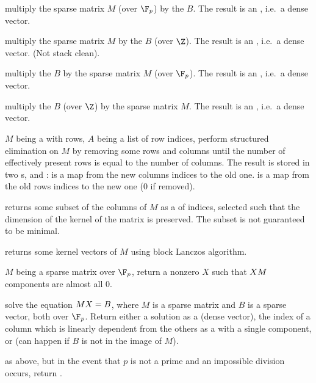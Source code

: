  multiply the sparse matrix $M$
(over $\F_p$) by the  $B$. The result is an , i.e.~a
dense vector.

 multiply the sparse matrix $M$
by the  $B$ (over $\Z$). The result is an , i.e.~a
dense vector. (Not stack clean).

 multiply the  $B$
by the sparse matrix $M$ (over $\F_p$). The result is an , i.e.~a
dense vector.

 multiply the   $B$ (over
$\Z$) by the sparse matrix $M$. The result is an , i.e.~a
dense vector.

$M$ being a  with  rows, $A$ being a list of row indices,
perform structured elimination on $M$ by removing some rows and columns until
the number of effectively present rows is equal to the number of columns.
The result is stored in two s,  and :
 is a map from the new columns indices to the old one.
 is a map from the old rows indices to the new one ($0$ if removed).

 returns some subset of the columns
of $M$ as a  of indices, selected such that the dimension of the
kernel of the matrix is preserved. The subset is not guaranteed to be minimal.

 returns some kernel vectors of $M$
using block Lanczos algorithm.

$M$ being a sparse matrix over $\F_p$, return a nonzero  $X$ such
that $X\*M$ components are almost all $0$.

solve the equation $M\*X = B$, where $M$ is a sparse matrix and $B$ is a sparse
vector, both over $\F_p$. Return either a solution as a  (dense
vector), the index of a column which is linearly dependent from the
others as a  with a single component, or 
(can happen if $B$ is not in the image of $M$).

as above, but in the event that $p$ is not a prime and an impossible division
occurs, return .

